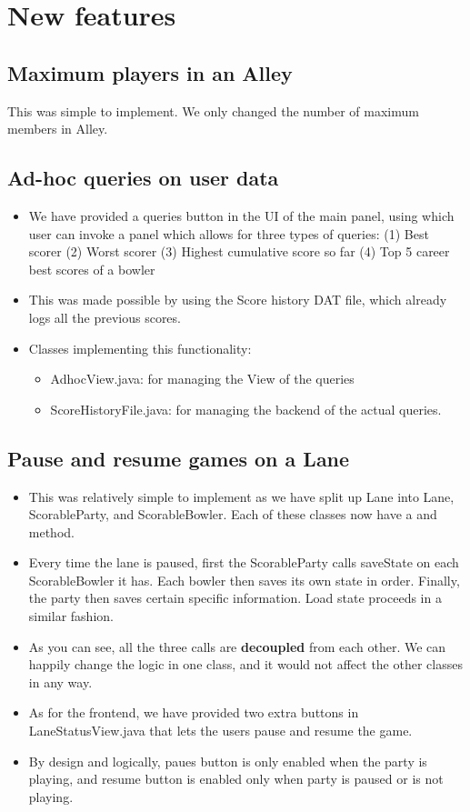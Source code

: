 \section{New features}

\subsection{Maximum players in an Alley}

This was simple to implement. We only changed the number of maximum members in Alley.

\subsection{Ad-hoc queries on user data}

\begin{itemize}
\item We have provided a queries button in the UI of the main panel, using which user can invoke a panel which allows for three types of queries: (1) Best scorer (2) Worst scorer (3) Highest cumulative score so far (4) Top 5 career best scores of a bowler
\item This was made possible by using the Score history DAT file, which already logs all the previous scores.
\item Classes implementing this functionality:
    \begin{itemize}
        \item AdhocView.java: for managing the View of the queries
        \item ScoreHistoryFile.java: for managing the backend of the actual queries.
    \end{itemize}
\end{itemize}

\subsection{Pause and resume games on a Lane}

\begin{itemize}
\item This was relatively simple to implement as we have split up Lane into Lane, ScorableParty, and ScorableBowler. Each of these classes now have a  and  method.
\item Every time the lane is paused, first the ScorableParty calls saveState on each ScorableBowler it has. Each bowler then saves its own state in order. Finally, the party then saves certain specific information. Load state proceeds in a similar fashion.
\item As you can see, all the three  calls are \textbf{decoupled} from each other. We can happily change the logic in one class, and it would not affect the other classes in any way.
\item As for the frontend, we have provided two extra buttons in LaneStatusView.java that lets the users pause and resume the game.
\item By design and logically, paues button is only enabled when the party is playing, and resume button is enabled only when party is paused or is not playing.
\end{itemize}
